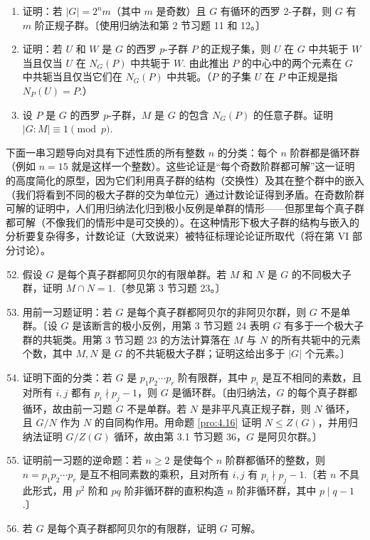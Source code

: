 \begin{enumerate}
\item 证明：若 \(|G| = 2^n m\)（其中 \(m\) 是奇数）且 \(G\) 有循环的西罗 2-子群，则 \(G\) 有 \(m\) 阶正规子群。〔使用归纳法和第 2 节习题 11 和 12。〕

\item 证明：若 \(U\) 和 \(W\) 是 \(G\) 的西罗 \(p\)-子群 \(P\) 的正规子集，则 \(U\) 在 \(G\) 中共轭于 \(W\) 当且仅当 \(U\) 在 \(N_G(P)\) 中共轭于 \(W\). 由此推出 \(P\) 的中心中的两个元素在 \(G\) 中共轭当且仅当它们在 \(N_G(P)\) 中共轭。（\(P\) 的子集 \(U\) 在 \(P\) 中正规是指 \(N_P(U) = P\).）

\item 设 \(P\) 是 \(G\) 的西罗 \(p\)-子群，\(M\) 是 \(G\) 的包含 \(N_G(P)\) 的任意子群。证明 \(|G : M| \equiv 1 \pmod{p}\).

\end{enumerate}

下面一串习题导向对具有下述性质的所有整数 \(n\) 的分类：每个 \(n\) 阶群都是循环群（例如 \(n = 15\) 就是这样一个整数）。这些论证是“每个奇数阶群都可解”这一证明的高度简化的原型，因为它们利用真子群的结构（交换性）及其在整个群中的嵌入（我们将看到不同的极大子群的交为单位元）通过计数论证得到矛盾。在奇数阶群可解的证明中，人们用归纳法化归到极小反例是单群的情形——但那里每个真子群都可解（不像我们的情形中是可交换的）。在这种情形下极大子群的结构与嵌入的分析要复杂得多，计数论证（大致说来）被特征标理论论证所取代（将在第 VI 部分讨论）。

\begin{enumerate}\setcounter{enumi}{51}

\item 假设 \(G\) 是每个真子群都阿贝尔的有限单群。若 \(M\) 和 \(N\) 是 \(G\) 的不同极大子群，证明 \(M \cap N = 1\).〔参见第 3 节习题 23。〕

\item 用前一习题证明：若 \(G\) 是每个真子群都阿贝尔的非阿贝尔群，则 \(G\) 不是单群。〔设 \(G\) 是该断言的极小反例，用第 3 节习题 24 表明 \(G\) 有多于一个极大子群的共轭类。用第 3 节习题 23 的方法计算落在 \(M\) 与 \(N\) 的所有共轭中的元素个数，其中 \(M, N\) 是 \(G\) 的不共轭极大子群；证明这给出多于 \(|G|\) 个元素。〕

\item 证明下面的分类：若 \(G\) 是 \(p_1p_2\cdots p_r\) 阶有限群，其中 \(p_i\) 是互不相同的素数，且对所有 \(i, j\) 都有 \(p_i \nmid p_j - 1\)，则 \(G\) 是循环群。〔由归纳法，\(G\) 的每个真子群都循环，故由前一习题 \(G\) 不是单群。若 \(N\) 是非平凡真正规子群，则 \(N\) 循环，且 \(G/N\) 作为 \(N\) 的自同构作用。用命题 \ref{pro:4.16} 证明 \(N \leq Z(G)\)，并用归纳法证明 \(G/Z(G)\) 循环，故由第 3.1 节习题 36，\(G\) 是阿贝尔群。〕

\item 证明前一习题的逆命题：若 \(n \geq 2\) 是使每个 \(n\) 阶群都循环的整数，则 \(n = p_1p_2\cdots p_r\) 是互不相同素数的乘积，且对所有 \(i, j\) 有 \(p_i \nmid p_j - 1\).〔若 \(n\) 不具此形式，用 \(p^2\) 阶和 \(pq\) 阶非循环群的直积构造 \(n\) 阶非循环群，其中 \(p \mid q - 1\).〕

\item 若 \(G\) 是每个真子群都阿贝尔的有限群，证明 \(G\) 可解。
\end{enumerate}

